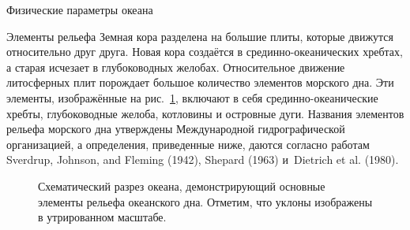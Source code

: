 \begin{chapter}{Физические параметры океана}
\begin{section}{Элементы рельефа}
Земная кора разделена на большие плиты, которые движутся относительно
друг друга. Новая кора создаётся в срединно-океанических хребтах, а
старая исчезает в глубоководных желобах. Относительное движение
литосферных плит порождает большое количество элементов морского
дна. Эти элементы, изображённые на рис.~\ref{fig:bathysketch}, включают в себя
срединно-океанические хребты, глубоководные желоба, котловины и островные дуги.
Названия элементов рельефа морского дна утверждены Международной
гидрографической организацией, а определения, приведенные ниже, даются 
согласно работам Sverdrup, Johnson, and Fleming (1942), Shepard (1963)
и~Dietrich et al. (1980).
%

\begin{figure}[b!]
\caption{Схематический разрез океана, демонстрирующий основные элементы рельефа
океанского дна. Отметим, что уклоны изображены в утрированном масштабе.}
\label{fig:bathysketch}
\end{figure}
%


\end{section}
\end{chapter}
